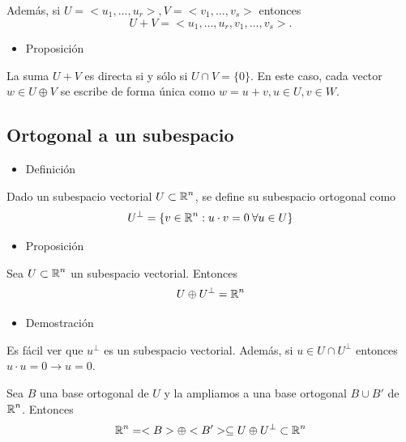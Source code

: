 Además, si $U=<u_1,\dots,u_r>,V=<v_1,\dots,v_s>$ entonces \[ U+V=<u_1,\dots,u_r,v_1,\dots,v_s>.\]

\begin{itemize}[label=\color{red}\textbullet, leftmargin=*]
	\item \color{lightblue}Proposición
\end{itemize}
La suma $U+V$ es directa si y sólo si $U\cap V=\{0\}$. En este caso, cada vector $w\in U\oplus V$ se escribe de forma única como $w=u+v,u\in U,v\in W$.
\subsection{Ortogonal a un subespacio}
\begin{itemize}[label=\color{red}\textbullet, leftmargin=*]
	\item \color{lightblue}Definición
\end{itemize}
Dado un subespacio vectorial $U\subset\operatorname{\mathbb{R}}^n$, se define su subespacio ortogonal como \[ U^\perp=\{v\in\operatorname{\mathbb{R}}^n:u\cdot v=0\:\forall u\in U\} \]
\begin{itemize}[label=\color{red}\textbullet, leftmargin=*]
	\item \color{lightblue}Proposición
\end{itemize}
Sea $U\subset\operatorname{\mathbb{R}}^n$ un subespacio vectorial. Entonces \[ U\oplus U^\perp=\operatorname{\mathbb{R}}^n\]
\begin{itemize}[label=\color{red}\textbullet, leftmargin=*]
	\item \color{lightblue}Demostración
\end{itemize}
Es fácil ver que $u^\perp$ es un subespacio vectorial. Además, si $u\in U\cap U^\perp$ entonces $u\cdot u=0\longrightarrow u=0$.

Sea $B$ una base ortogonal de $U$ y la ampliamos a una base ortogonal $B\cup B'$ de $\operatorname{\mathbb{R}}^n$. Entonces \[ \operatorname{\mathbb{R}}^n=<B>\oplus <B'>\subseteq U\oplus U^\perp\subset\operatorname{\mathbb{R}}^n \]
